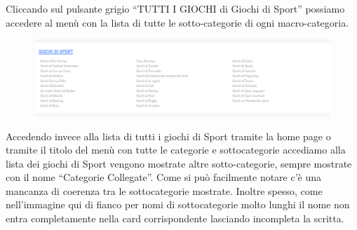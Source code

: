 \documentclass[../Report.tex]{subfiles}
\begin{document}
    Cliccando sul pulsante grigio “TUTTI I GIOCHI di Giochi di Sport” possiamo accedere al menù con la lista di tutte le sotto-categorie di ogni macro-categoria. 

    \begin{figure}[H]
        \includegraphics[width=\linewidth]{Assestment11.png}
        \centering
    \end{figure}
    
    Accedendo invece alla lista di tutti i giochi di Sport tramite la home page o tramite il titolo del menù con tutte le categorie e sottocategorie accediamo alla lista dei giochi di Sport vengono mostrate altre sotto-categorie, sempre mostrate con il nome “Categorie Collegate”. Come si può facilmente notare c’è una mancanza di coerenza tra le sottocategorie mostrate. Inoltre spesso, come nell’immagine qui di fianco per nomi di sottocategorie molto lunghi il nome non entra completamente nella card corrispondente lasciando incompleta la scritta.
\end{document}
